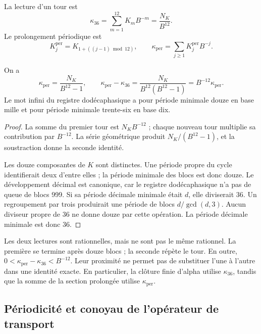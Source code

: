 \begin{definition}
\label{def:k-kappas}
La lecture d'un tour est
\[
 \kappa_{36}=\sum_{m=1}^{12}K_mB^{-m}=\frac{N_K}{B^{12}}.
\]
Le prolongement périodique est
\[
 K_j^{\mathrm{per}}=K_{1+((j-1)\bmod12)},\qquad
 \kappa_{\mathrm{per}}=\sum_{j\geq1}K_j^{\mathrm{per}}B^{-j}.
\]
\end{definition}

\begin{proposition}
\label{prop:k-periodo}
On a
\begin{equation}
 \kappa_{\mathrm{per}}=\frac{N_K}{B^{12}-1},\qquad
 \kappa_{\mathrm{per}}-\kappa_{36}
 =\frac{N_K}{B^{12}(B^{12}-1)}
 =B^{-12}\kappa_{\mathrm{per}}.
 \label{eq:k-diferencia-kappas}
\end{equation}
Le mot infini du registre dodécaphasique a pour période minimale douze en base mille et pour période minimale trente-six en base dix.
\end{proposition}

\begin{proof}
La somme du premier tour est \(N_KB^{-12}\) ; chaque nouveau tour
multiplie sa contribution par \(B^{-12}\). La série géométrique produit
\(N_K/(B^{12}-1)\), et la soustraction donne la seconde identité.

Les douze composantes de \(K\) sont distinctes. Une période propre du cycle
identifierait deux d'entre elles ; la période minimale des blocs est donc
douze. Le développement décimal est canonique, car le registre dodécaphasique n'a pas de queue
de blocs 999. Si sa période décimale minimale était \(d\), elle diviserait
36. Un regroupement par trois produirait une période de blocs
\(d/\gcd(d,3)\). Aucun diviseur propre de 36 ne donne douze par cette
opération. La période décimale minimale est donc 36.
\end{proof}

Les deux lectures sont rationnelles, mais ne sont pas le même rationnel. La première se termine après douze blocs ; la seconde répète le tour. En outre, \(0<\kappa_{\mathrm{per}}-\kappa_{36}<B^{-12}\). Leur proximité ne permet pas de substituer l'une à l'autre dans une identité exacte. En particulier, la clôture finie d'alpha utilise \(\kappa_{36}\), tandis que la somme de la section prolongée utilise \(\kappa_{\mathrm{per}}\).



\subsection{Périodicité et conoyau de l'opérateur de transport}
\label{subsec:k-clase-acarreo}

